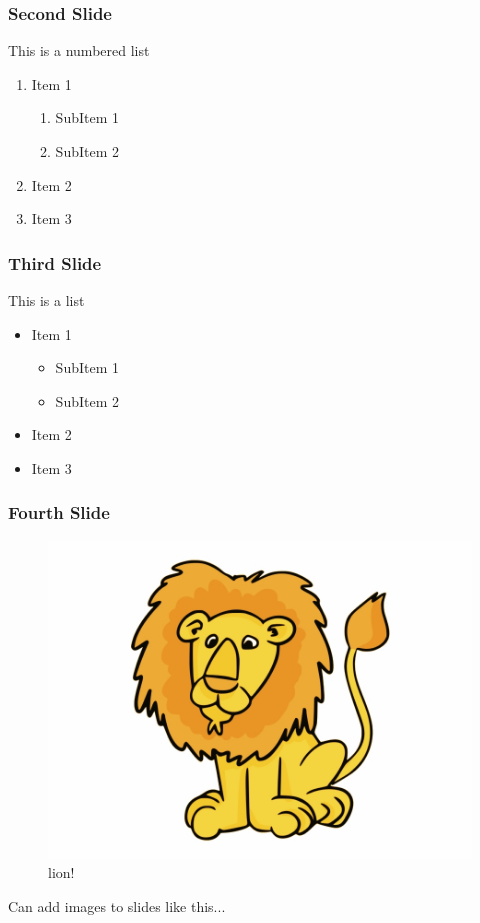 \documentclass[11 pt, 
			   aspectratio=169
			   ]{beamer}
\begin{document}
\begin{frame}
	\frametitle{Second Slide}
	This is a numbered list
	\begin{enumerate}
		\item Item 1
		\begin{enumerate}
			\item SubItem 1
			\item SubItem 2
		\end{enumerate}
		\item Item 2
		\item Item 3
	\end{enumerate}
\end{frame}


\begin{frame}
	\frametitle{Third Slide}
	This is a list
	\begin{itemize}
		\item Item 1
		\begin{itemize}
			\item SubItem 1
			\item SubItem 2
		\end{itemize}
		\item Item 2
		\item Item 3
	\end{itemize}
\end{frame}

\begin{frame}
	\frametitle{Fourth Slide}
	\begin{figure}
		\includegraphics[height=0.5\textheight]{lion}
		\caption{lion!}
	\end{figure}
	Can add images to slides like this...
\end{frame}
\end{document}

